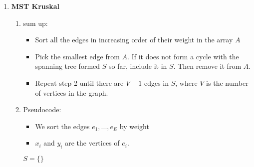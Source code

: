 \documentclass[11pt]{article}
\begin{document}
\begin{enumerate}
    \item \textbf{MST Kruskal}
    \begin{enumerate}
        \item sum up:
        \begin{itemize}
            \item Sort all the edges in increasing order of their weight in the array $A$
            \item Pick the smallest edge from $A$. If it does not form a cycle with the spanning tree formed $S$ so far, include it in $S$. Then remove it from $A$.
            \item Repeat step 2 until there are $V-1$ edges in $S$, where $V$ is the number of vertices in the graph.
        \end{itemize}
        \item Pseudocode:
        \begin{itemize}
            \item We sort the edges $e_1, ..., e_E$ by weight
            \item $x_i$ and $y_i$ are the vertices of $e_i$.
        \end{itemize}
        \begin{algorithm}[H]
            $S = \{\}$ \\
        \end{algorithm}
    \end{enumerate}


\end{enumerate}
\end{document}
